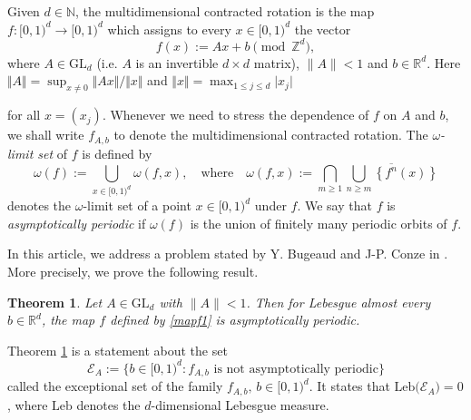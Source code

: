 \documentclass[12pt,reqno,a4paper]{amsart}%
\newtheorem{theorem}{Theorem}
\theoremstyle{definition}
\theoremstyle{remark}
\newcommand{\Rr}{\mathbb{R}}
\newcommand{\Nn}{\mathbb{N}}
\newcommand{\Zz}{\mathbb{Z}}
\begin{document}
Given $d\in\Nn$, the multidimensional contracted rotation is the map {$f\colon [0,1)^d\to[0,1)^d$} which assigns to every $x\in[0,1)^d$ the vector 
\begin{equation}\label{mapf1}
f(x):=Ax+b\pmod{\Zz^d},
\end{equation}
where $A\in\mathrm{GL}_d$ (i.e. $A$ is an invertible $d\times d$ matrix),  $\|A\|<1$ and $b\in\Rr^d$. Here $\Vert A\Vert = \sup_{x\neq 0} \Vert Ax\Vert\big/\Vert x\Vert$ and $\Vert x\Vert=\max_{1\le j\le d} \vert x_j\vert$ {for all $x=(x_j)$.
 Whenever we need to stress the dependence of $f$ on $A$ and $b$, we shall write $f_{A,b}$ to denote the multidimensional contracted rotation. 
The \textit{$\omega$-limit set} of $f$ is defined by
\begin{equation}\label{omegalimitset}
\omega(f) := \bigcup_{x\in [0,1)^d}  \omega(f,x), \quad\textrm{where}\quad
 \omega(f,x) := \bigcap_{m\ge 1} \overline{\bigcup_{n\ge m} {\left\{f^n(x)\right\}}}
\end{equation}
denotes the $\omega$-limit set of a point $x\in [0,1)^d$ under $f$.
We say that $f$ is \textit{asymptotically periodic} if $\omega(f)$ is the union of finitely many periodic orbits of $f$.

In this article, we address a problem stated by Y. Bugeaud and J-P. Conze in \cite[p. 218]{zbMATH01300448}. More precisely, we prove the following result.


\begin{theorem}\label{thm1} Let $A\in\mathrm{GL}_d$ with $\|A\|<1$. Then
 for Lebesgue almost every $b\in\mathbb{R}^d$, the map $f$ defined by \eqref{mapf1} is asymptotically periodic. 
\end{theorem}





{Theorem \ref{thm1} is a statement about the set $$
\mathcal{E}_A:=\{b\in [0,1)^d\colon f_{A,b}\text{ is not asymptotically periodic}\}
$$
called the exceptional set of the family ${f_{A,b},\,b\in [0,1)^d}$. It states that $\mathrm{Leb}\big(\mathcal{E}_A\big)=0$, where $\mathrm{Leb}$ denotes the $d$-dimensional Lebesgue measure.
 
}}
\end{document}

